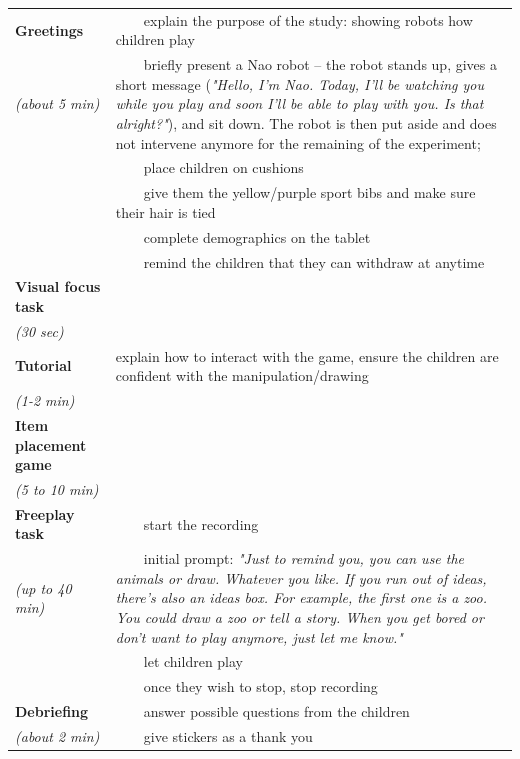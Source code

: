 \documentclass{article}
\begin{document}
\newcommand{\tabitem}{~~\llap{\textbullet}~~}
    \begin{tabular}{@{}p{0.2\linewidth}p{0.8\linewidth}@{}}
\toprule
\bf Greetings                     & \tabitem explain the purpose of the study: showing robots how children play  \\
\emph{(about 5 min)}              & \tabitem briefly present a Nao robot -- the robot stands up, gives a short
                                    message (\emph{"Hello, I'm Nao. Today, I'll be watching you while you
                                    play and soon I'll be able to play with you. Is that alright?"}), and
                                    sit down. The robot is then put aside and does not intervene anymore
                                    for the remaining of the experiment; \\
                                  & \tabitem place children on cushions  \\ 
                                  & \tabitem give them the yellow/purple sport
                                  bibs and make sure their hair is tied \\ 
                                  & \tabitem complete demographics on the tablet \\
                                  & \tabitem remind the children that they can withdraw at anytime \\ \midrule
\bf Visual focus task             &  \\ 
\emph{(30 sec)}                   &  \\ \midrule
\bf Tutorial                      & explain how to interact with the game, ensure the children are confident with the manipulation/drawing \\ 
\emph{(1-2 min)}                  &  \\ \midrule
\bf Item placement game           &  \\
\emph{(5 to 10 min)}              &  \\ \midrule
\bf Freeplay task                 & \tabitem start the recording \\
\emph{(up to 40 min)}             & \tabitem initial prompt: \emph{"Just to remind you, you can use the animals or draw. Whatever you
                                  like. If you run out of ideas, there's also an ideas box. For example, the first one is a
                                  zoo. You could draw a zoo or tell a story. When you get bored or don't want to play
                                  anymore, just let me know."} \\
                                  & \tabitem let children play \\
                                  & \tabitem once they wish to stop, stop recording \\ \midrule
\bf Debriefing                    &  \tabitem answer possible questions from the children \\
\emph{(about 2 min)}              & \tabitem give stickers as a thank you \\ \bottomrule
\end{tabular}
\end{document}
